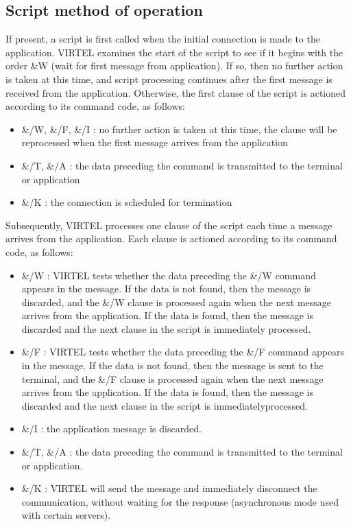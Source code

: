 \documentclass[letterpaper,10pt,english]{sphinxmanual}
\begin{document}
\subsection{Script method of operation}
\label{\detokenize{connectivity_guide:script-method-of-operation}}
If present, a script is first called when the initial connection is made to the application. VIRTEL examines the start of the script to see if it begins with the order \&W (wait for first message from application). If so, then no further action is taken at this time, and script processing continues after the first message is received from the application. Otherwise, the first clause of the script is actioned according to its command code, as follows:
\begin{itemize}
\item {} 
\&/W, \&/F, \&/I : no further action is taken at this time, the clause will be reprocessed when the first message arrives from the application

\item {} 
\&/T, \&/A : the data preceding the command is transmitted to the terminal or application

\item {} 
\&/K : the connection is scheduled for termination

\end{itemize}

Subsequently, VIRTEL processes one clause of the script each time a message arrives from the application. Each clause is actioned according to its command code, as follows:
\begin{itemize}
\item {} 
\&/W : VIRTEL tests whether the data preceding the \&/W command appears in the message. If the data is not found, then the message is discarded, and the \&/W clause is processed again when the next message arrives from the application. If the data is found, then the message is discarded and the next clause in the script is immediately processed.

\item {} 
\&/F : VIRTEL tests whether the data preceding the \&/F command appears in the message. If the data is not found, then the message is sent to the terminal, and the \&/F clause is processed again when the next message arrives from the application. If the data is found, then the message is discarded and the next clause in the script is immediatelyprocessed.

\item {} 
\&/I : the application message is discarded.

\item {} 
\&/T, \&/A : the data preceding the command is transmitted to the terminal or application.

\item {} 
\&/K : VIRTEL will send the message and immediately disconnect the communication, without waiting for the response (asynchronous mode used with certain servers).

\end{itemize}
\end{document}
